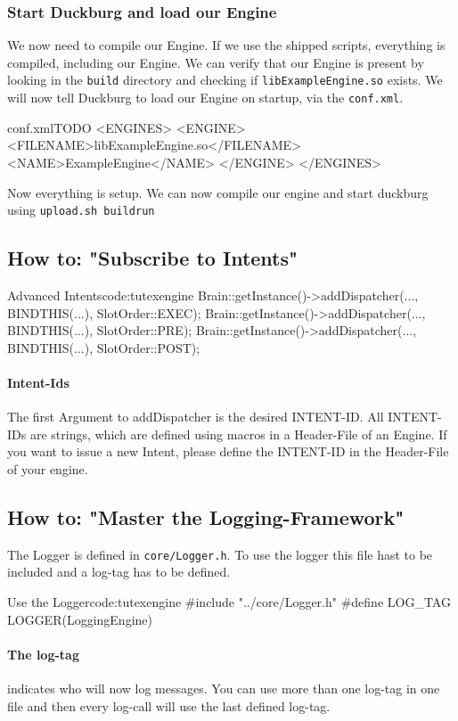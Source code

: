 \documentclass[12pt,a4paper]{article}
\begin{document}
\subsubsection{Start Duckburg and load our Engine} 
We now need to compile our Engine. If we use the shipped scripts, everything is
compiled, including our Engine. We can verify that our Engine is present by 
looking in the \texttt{build} directory and checking if \texttt{libExampleEngine.so}
exists.
We will now tell Duckburg to load our Engine on startup, via the \texttt{conf.xml}.
\begin{duckxml}{conf.xml}{TODO}
<ENGINES>
    <ENGINE>
        <FILENAME>libExampleEngine.so</FILENAME>
        <NAME>ExampleEngine</NAME>
    </ENGINE>
</ENGINES>
\end{duckxml}
Now everything is setup. We can now compile our engine and start
duckburg using \texttt{upload.sh buildrun}

\subsection{How to: "Subscribe to Intents"}

\begin{duckc++}{Advanced Intents}{code:tutexengine}
    Brain::getInstance()->addDispatcher(..., 
        BINDTHIS(...), SlotOrder::EXEC);
    Brain::getInstance()->addDispatcher(...,
        BINDTHIS(...), SlotOrder::PRE);
    Brain::getInstance()->addDispatcher(..., 
        BINDTHIS(...), SlotOrder::POST);
\end{duckc++}
\paragraph{Intent-Ids}
The first Argument to addDispatcher is the desired INTENT-ID.
All INTENT-IDs are strings, which are defined using macros in
a Header-File of an Engine.
If you want to issue a new Intent, please define the INTENT-ID 
in the Header-File of your engine.
\subsection{How to: "Master the Logging-Framework"}
The Logger is defined in \texttt{core/Logger.h}. To use the logger
this file hast to be included and a log-tag has to be defined.
\begin{duckc++}{Use the Logger}{code:tutexengine}
#include "../core/Logger.h"
#define LOG_TAG LOGGER(LoggingEngine)
\end{duckc++}
\paragraph{The log-tag} indicates who will now log messages.
You can use more than one log-tag in one file and then every log-call
will use the last defined log-tag.
\end{document}
